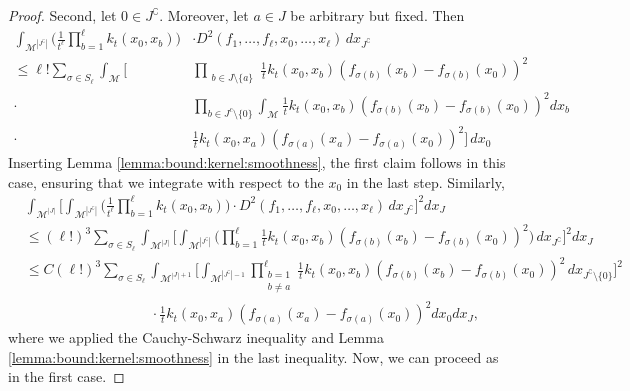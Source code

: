 \documentclass[10pt,a4paper]{amsart}
\begin{document}
\begin{proof}
    Second, let $0\in J^\complement$. Moreover, let $a\in J$ be arbitrary but fixed. Then 
    \begin{align*}
        \int_{\mathcal{M}^{|J^\complement|}}
         \Big( \frac{1}{t^\ell}\prod_{b=1}^\ell k_t(x_0,x_b)\Big)&
        \cdot D^2(f_1,\dots,f_\ell,x_0,\dots,x_\ell)\, dx_{J^\complement}
        \\\leq \ell !\sum_{\sigma\in S_\ell}\int_{\mathcal{M}}\Big[&\prod_{\substack{b\in J\setminus\{a\}}}\frac{1}{t} k_t(x_0,x_b) (f_{\sigma(b)}(x_b)-f_{\sigma(b)}(x_0))^2  
        \\\cdot&\prod_{b\in J^c\setminus\{0\}}\int_{\mathcal{M}}\frac{1}{t} k_t(x_0,x_b) (f_{\sigma(b)}(x_b)-f_{\sigma(b)}(x_0))^2dx_b\\
          \cdot & \frac{1}{t} k_t(x_0,x_a) (f_{\sigma(a)}(x_a)-f_{\sigma(a)}(x_0))^2\Big]\,dx_0
    \end{align*}
    Inserting Lemma \ref{lemma:bound:kernel:smoothness}, the first claim follows in this case, ensuring that we integrate with respect to the $x_0$ in the last step. Similarly,
    \begin{align*}
        &\int_{\mathcal{M}^{|J|}}  \Big[ \int_{\mathcal{M}^{|J^\complement|}} \Big( \frac{1}{t^\ell}\prod_{b=1}^\ell k_t(x_0,x_b) \Big) \cdot D^2(f_1,\dots,f_\ell,x_0,\dots,x_\ell)\, dx_{J^\complement} \Big]^2dx_J\\
        & \leq (\ell!)^3 \sum_{\sigma\in S_\ell}\int_{\mathcal{M}^{|J|}} \Big[\int_{\mathcal{M}^{|J^\complement|}} \Big( \prod_{b=1}^\ell\frac{1}{t} k_t(x_0,x_b) (f_{\sigma(b)}(x_b)-f_{\sigma(b)}(x_0))^2\Big) \, dx_{J^\complement}\Big]^2dx_J\\
        & \leq C(\ell!)^3 \sum_{\sigma\in S_\ell} \int_{\mathcal{M}^{|J|+1}}
        \Big[\int_{\mathcal{M}^{|J^\complement|-1}} \prod_{\substack{b=1\\b\neq a}}^\ell\frac{1}{t} k_t(x_0,x_b) (f_{\sigma(b)}(x_b)-f_{\sigma(b)}(x_0))^2\, dx_{J^\complement\setminus\{0\}}\Big]^2\\
        &\qquad \qquad\qquad\qquad\quad   \cdot\frac{1}{t} k_t(x_0,x_a) (f_{\sigma(a)}(x_a)-f_{\sigma(a)}(x_0))^2dx_0dx_J,
    \end{align*} 
where we applied the Cauchy-Schwarz inequality and Lemma \ref{lemma:bound:kernel:smoothness} in the last inequality. Now, we can proceed as in the first case.
\end{proof}
\end{document}
